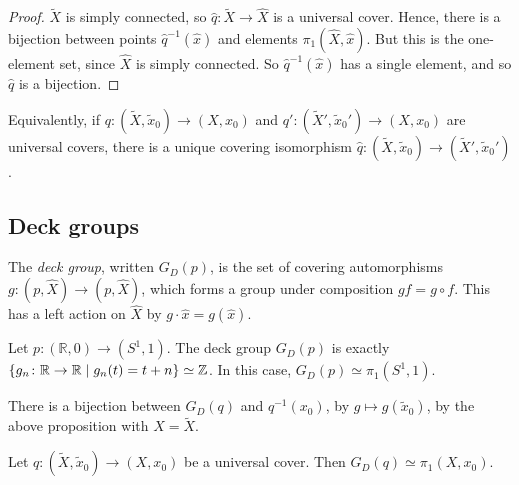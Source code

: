 \begin{proof}
	\( \widetilde X \) is simply connected, so \( \hat q \colon \widetilde X \to \hat X \) is a universal cover.
	Hence, there is a bijection between points \( \hat q^{-1}(\hat x) \) and elements \( \pi_1(\hat X, \hat x) \).
	But this is the one-element set, since \( \hat X \) is simply connected.
	So \( \hat q^{-1}(\hat x) \) has a single element, and so \( \hat q \) is a bijection.
\end{proof}
Equivalently, if \( q \colon (\widetilde X, \widetilde x_0) \to (X, x_0) \) and \( q' \colon (\widetilde X', \widetilde x_0') \to (X, x_0) \) are universal covers, there is a unique covering isomorphism \( \hat q \colon (\widetilde X, \widetilde x_0) \to (\widetilde X', \widetilde x_0') \).

\subsection{Deck groups}
\begin{definition}
	The \emph{deck group}, written \( G_D(p) \), is the set of covering automorphisms \( g \colon (p, \hat X) \to (p, \hat X) \), which forms a group under composition \( gf = g \circ f \).
	This has a left action on \( \hat X \) by \( g \cdot \hat x = g(\hat x) \).
\end{definition}
\begin{example}
	Let \( p \colon (\mathbb R, 0) \to (S^1, 1) \).
	The deck group \( G_D(p) \) is exactly \( \qty{g_n \colon \mathbb R \to \mathbb R \mid g_n(t) = t + n} \simeq \mathbb Z \).
	In this case, \( G_D(p) \simeq \pi_1(S^1, 1) \).
\end{example}
\begin{example}
	There is a bijection between \( G_D(q) \) and \( q^{-1}(x_0) \), by \( g \mapsto g(\widetilde x_0) \), by the above proposition with \( \hat X = \widetilde X \).
\end{example}
\begin{theorem}
	Let \( q \colon (\widetilde X, \widetilde x_0) \to (X, x_0) \) be a universal cover.
	Then \( G_D(q) \simeq \pi_1(X,x_0) \).
\end{theorem}
